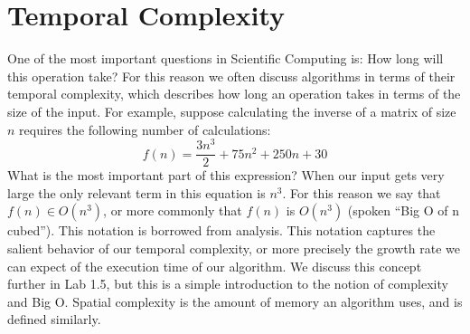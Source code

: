 

\section*{Temporal Complexity}



One of the most important questions in Scientific Computing is: How long will this operation take? For this reason we often discuss algorithms in terms of their temporal complexity, which describes how long an operation takes in terms of the size of the input. For example, suppose calculating the inverse of a matrix of size $n$ requires the following number of calculations:
\[
f(n) = \frac{3n^3}{2} + 75n^2 + 250n + 30
\]
What is the most important part of this expression? When our input gets very large the only relevant term in this equation is $n^3$. For this reason we say that $f(n) \in O(n^3)$, or more commonly that $f(n)$ is $O(n^3)$ (spoken ``Big O of n cubed''). This notation is borrowed from analysis. This notation captures the salient behavior of our temporal complexity, or more precisely the growth rate we can expect of the execution time of our algorithm. We discuss this concept further in Lab 1.5, but this is a simple introduction to the notion of complexity and Big O. Spatial complexity is the amount of memory an algorithm uses, and is defined similarly. 

